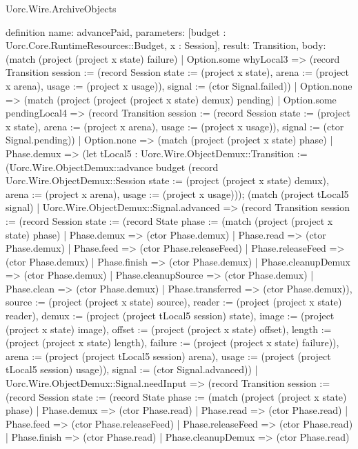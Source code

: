 \begin{lexlean}{Uorc.Wire.ArchiveObjects}
\begin{semanticmodule}
definition{
  name: advancePaid,
  parameters: [budget : Uorc.Core.RuntimeResources::Budget, x : Session],
  result: Transition,
  body: (match (project (project x state) failure)
    | Option.some whyLocal3 => (record Transition {session := (record Session {state := (project x state), arena := (project x arena), usage := (project x usage)}), signal := (ctor Signal.failed)})
    | Option.none => (match (project (project (project x state) demux) pending)
      | Option.some pendingLocal4 => (record Transition {session := (record Session {state := (project x state), arena := (project x arena), usage := (project x usage)}), signal := (ctor Signal.pending)})
      | Option.none => (match (project (project x state) phase)
        | Phase.demux => (let tLocal5 : Uorc.Wire.ObjectDemux::Transition := (Uorc.Wire.ObjectDemux::advance budget (record Uorc.Wire.ObjectDemux::Session {state := (project (project x state) demux), arena := (project x arena), usage := (project x usage)})); (match (project tLocal5 signal)
          | Uorc.Wire.ObjectDemux::Signal.advanced => (record Transition {session := (record Session {state := (record State {phase := (match (project (project x state) phase)
            | Phase.demux => (ctor Phase.demux)
            | Phase.read => (ctor Phase.demux)
            | Phase.feed => (ctor Phase.releaseFeed)
            | Phase.releaseFeed => (ctor Phase.demux)
            | Phase.finish => (ctor Phase.demux)
            | Phase.cleanupDemux => (ctor Phase.demux)
            | Phase.cleanupSource => (ctor Phase.demux)
            | Phase.clean => (ctor Phase.demux)
            | Phase.transferred => (ctor Phase.demux)), source := (project (project x state) source), reader := (project (project x state) reader), demux := (project (project tLocal5 session) state), image := (project (project x state) image), offset := (project (project x state) offset), length := (project (project x state) length), failure := (project (project x state) failure)}), arena := (project (project tLocal5 session) arena), usage := (project (project tLocal5 session) usage)}), signal := (ctor Signal.advanced)})
          | Uorc.Wire.ObjectDemux::Signal.needInput => (record Transition {session := (record Session {state := (record State {phase := (match (project (project x state) phase)
            | Phase.demux => (ctor Phase.read)
            | Phase.read => (ctor Phase.read)
            | Phase.feed => (ctor Phase.releaseFeed)
            | Phase.releaseFeed => (ctor Phase.read)
            | Phase.finish => (ctor Phase.read)
            | Phase.cleanupDemux => (ctor Phase.read)
}}}}
\end{semanticmodule}
\end{lexlean}
